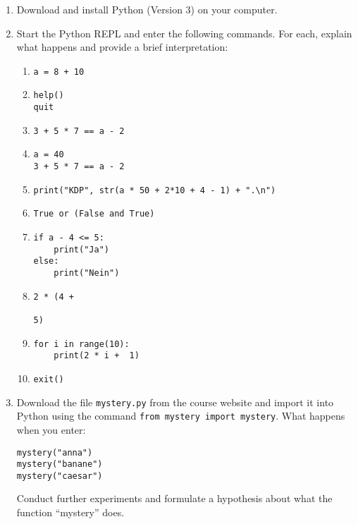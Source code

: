 \documentclass[a4paper,twoside,12pt]{article}
\begin{document}
\begin{description}
\begin{enumerate}
\item Download and install Python (Version 3) on your computer.
\item Start the Python REPL and enter the following commands. 
  For each, explain what happens and provide a brief interpretation:
  \begin{enumerate}
    \item \begin{verbatim}a = 8 + 10\end{verbatim}
    \item \begin{verbatim}
help()
quit 
\end{verbatim}
    \item \begin{verbatim}3 + 5 * 7 == a - 2\end{verbatim}
    \item \begin{verbatim}
a = 40
3 + 5 * 7 == a - 2
\end{verbatim}
\item \begin{verbatim}print("KDP", str(a * 50 + 2*10 + 4 - 1) + ".\n")\end{verbatim}
    \item \begin{verbatim}True or (False and True)\end{verbatim}
    \item \begin{verbatim}
if a - 4 <= 5:
    print("Ja")
else:
    print("Nein")
          \end{verbatim}
    \item \begin{verbatim}
2 * (4 +

5)
\end{verbatim}
    \item \begin{verbatim}
for i in range(10):
    print(2 * i +  1)
    \end{verbatim}
    \item \begin{verbatim}exit()\end{verbatim}
  \end{enumerate}
\item
  Download the file \texttt{mystery.py} from the course website
  and import it into Python using the command
  \texttt{from mystery import mystery}.
  What happens when you enter:
  \begin{verbatim}
mystery("anna") 
mystery("banane")
mystery("caesar") 
\end{verbatim}

  Conduct further experiments and formulate a hypothesis about what the function ``mystery'' does.
\end{enumerate}


\end{description}
\end{document}
